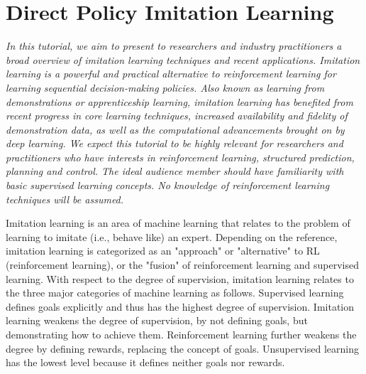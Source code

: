 \section{Direct Policy Imitation Learning}
\textit{In this tutorial, 
we aim to present to researchers and industry practitioners a broad overview 
of imitation learning techniques and recent applications. 
Imitation learning is a powerful and practical alternative 
to reinforcement learning for learning sequential decision-making policies. 
Also known as learning from demonstrations or apprenticeship learning, 
imitation learning has benefited from recent progress in core learning techniques, 
increased availability and fidelity of demonstration data, 
as well as the computational advancements brought on by deep learning. 
We expect this tutorial to be highly relevant for researchers and 
practitioners who have interests in reinforcement learning, 
structured prediction, planning and control. 
The ideal audience member should have familiarity with basic 
supervised learning concepts. 
No knowledge of reinforcement learning techniques will be assumed.
}

\newcommand{\state}[1]{\underline{x}_{#1}}
\newcommand{\action}[1]{\underline{u}_{#1}}
\newcommand{\timestep}{t}
\newcommand{\probability}{p}
\newcommand{\parentheses}[1]{\left({#1}\right)}
\newcommand{\brackets}[1]{\left[{#1}\right]}
\newcommand{\braces}[1]{\left\{{#1}\right\}}
\newcommand{\stateDomain}{\mathcal{X}}
\newcommand{\actionDomain}{\mathcal{U}}
\newcommand{\policy}[2]{\pi^{#1}_{#2}}
\newcommand{\demonstration}{\xi}
\newcommand{\expertt}{*}
\newcommand{\parameterVector}{\underline{\theta}}
\newcommand{\trajectory}{\tau}


Imitation learning is an area of machine learning 
that relates to the problem 
of learning to
imitate (i.e., behave like) an expert.
Depending on the reference, 
imitation learning is categorized as an
"approach"
or "alternative"
to RL (reinforcement learning),
or the "fusion" 
of reinforcement learning and supervised learning.
With respect to the degree of supervision,
imitation learning relates to the three major categories of machine learning as follows.
Supervised learning defines goals explicitly 
and thus has the highest degree of supervision.
Imitation learning weakens the degree of supervision,
by not defining goals, but demonstrating how to achieve them. 
Reinforcement learning further weakens the degree
by defining rewards, replacing the concept of goals. 
Unsupervised learning has the lowest level 
because it defines neither goals nor rewards.



